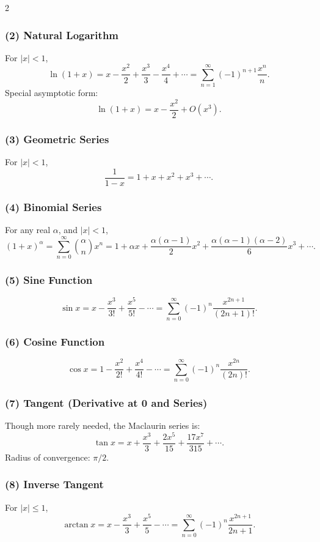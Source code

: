 \documentclass[10pt]{article}
\theoremstyle{definition}
\begin{document}
\begin{multicols*}{2}
\subsubsection*{(2) Natural Logarithm}
For \(|x|<1\),
\[
\ln(1+x)
    = x - \frac{x^2}{2} + \frac{x^3}{3} - \frac{x^4}{4} + \cdots
    = \sum_{n=1}^\infty (-1)^{n+1}\frac{x^n}{n}.
\]
Special asymptotic form:
\[
\ln(1+x) = x - \frac{x^2}{2} + O(x^3).
\]

\subsubsection*{(3) Geometric Series}
For \(|x|<1\),
\[
\frac{1}{1-x}
    = 1 + x + x^2 + x^3 + \cdots.
\]

\subsubsection*{(4) Binomial Series}
For any real \(\alpha\), and \(|x|<1\),
\[
(1+x)^\alpha
    = \sum_{n=0}^{\infty}
      \binom{\alpha}{n} x^n
    = 1 + \alpha x + \frac{\alpha(\alpha-1)}{2}x^2
        + \frac{\alpha(\alpha-1)(\alpha-2)}{6}x^3 + \cdots.
\]

\subsubsection*{(5) Sine Function}
\[
\sin x
= x - \frac{x^3}{3!} + \frac{x^5}{5!} - \cdots
= \sum_{n=0}^{\infty} (-1)^n \frac{x^{2n+1}}{(2n+1)!}.
\]

\subsubsection*{(6) Cosine Function}
\[
\cos x
= 1 - \frac{x^2}{2!} + \frac{x^4}{4!} - \cdots
= \sum_{n=0}^{\infty} (-1)^n \frac{x^{2n}}{(2n)!}.
\]

\subsubsection*{(7) Tangent (Derivative at 0 and Series)}
Though more rarely needed, the Maclaurin series is:
\[
\tan x
= x + \frac{x^3}{3} + \frac{2x^5}{15} + \frac{17x^7}{315} + \cdots.
\]
Radius of convergence: \(\pi/2\).

\subsubsection*{(8) Inverse Tangent}
For \(|x|\le 1\),
\[
\arctan x
    = x - \frac{x^3}{3} + \frac{x^5}{5} - \cdots
    = \sum_{n=0}^{\infty} (-1)^n \frac{x^{2n+1}}{2n+1}.
\]


\end{multicols*}
\end{document}
